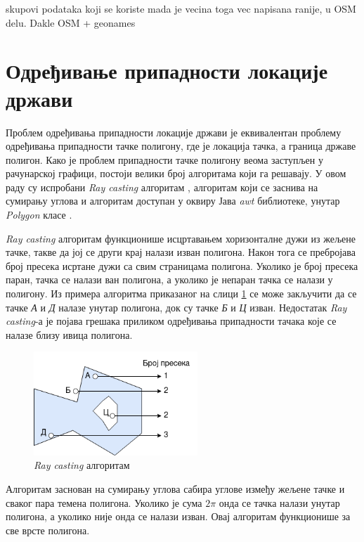 \documentclass[12pt,oneside]{memoir}
\begin{document}
skupovi podataka koji se koriste mada je vecina toga vec napisana ranije, u OSM delu. Dakle OSM + geonames

\section{Одређивање припадности локације држави}
\label{sec:poly_cont}

Проблем одређивања припадности локације држави је еквивалентан проблему одређивања припадности тачке полигону, где је локација тачка, а граница државе полигон. Како је проблем припадности тачке полигону веома заступљен у рачунарској графици, постоји велики број алгоритама који га решавају. У овом раду су испробани \textit{Ray casting} алгоритам \cite{inside_polygon}, алгоритам који се заснива на сумирању углова \cite{inside_polygon} и алгоритам доступан у оквиру Јава \textit{awt} библиотеке, унутар \textit{Polygon} класе \cite{java_awt_polygon}.

\textit{Ray casting} алгоритам функционише исцртавањем хоризонталне дужи из жељене тачке, такве да јој се други крај налази изван полигона. Након тога се пребројава број пресека исртане дужи са свим страницама полигона. Уколико је број пресека паран, тачка се налази ван полигона, а уколико је непаран тачка се налази у полигону. Из примера алгоритма приказаног на слици \ref{fig:ray_cast_algo_example} се може закључити да се тачке \textit{А} и \textit{Д} налазе унутар полигона, док су тачке \textit{Б} и \textit{Ц} изван. Недостатак \textit{Ray casting}-а је појава грешака приликом одређивања припадности тачака које се налазе близу ивица полигона. %

\begin{figure}[!ht]
  \centering
  \includegraphics[width=0.55\textwidth]{pictures/ray_cast_pic_example.png}
  \caption{\textit{Ray casting} алгоритам}
  \label{fig:ray_cast_algo_example}
\end{figure}

Алгоритам заснован на сумирању углова сабира углове између жељене тачке и сваког пара темена полигона. Уколико је сума $2\pi$ онда се тачка налази унутар полигона, а уколико није онда се налази изван. Овај алгоритам функционише за све врсте полигона.
\end{document}
